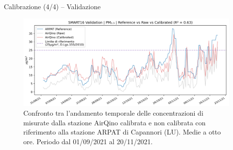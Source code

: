 \begin{frame}{Calibrazione (4/4) – Validazione}
\begin{center}
\begin{figure}[H]
\centering
\captionsetup{justification=centering}
\includegraphics[width=\textwidth]{images/val_pm2.5.png}
\caption{Confronto tra l’andamento temporale delle concentrazioni di  misurate dalla stazione AirQino calibrata e non calibrata con riferimento alla stazione ARPAT di Capannori (LU). Medie a otto ore. Periodo dal 01/09/2021 al 20/11/2021.}
\end{figure}
\end{center}
\end{frame}

